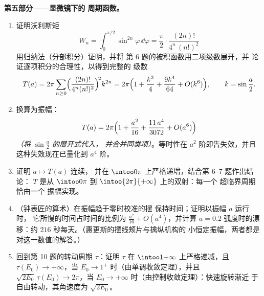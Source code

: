 \begin{problem}
\medskip
\noindent\textbf{第五部分——显微镜下的
周期函数。}
\begin{enumerate}[resume]
  \item 证明沃利斯矩
        \[
        W_n = \int_0^{\pi/2}\sin^{2n}\varphi\,\dd\varphi
        = \frac\pi2\cdot\frac{(2n)!}{4^n\,(n!)^2}
        \]
        用归纳法（分部积分）证明，并将
        第 6 题的被积函数用二项级数展开，并
        论证逐项积分的合理性，以得到完整的
        级数
        \[
        T(a) = 2\pi\sum_{n\geq0}
        \Bigl(\frac{(2n)!}{4^n(n!)^2}\Bigr)^{\!2}k^{2n}
        = 2\pi\Bigl(1 + \frac{k^2}4 + \frac{9k^4}{64}
        + O(k^6)\Bigr),
        \qquad k = \sin\frac a2 .
        \]
  \item 换算为振幅：
        \[
        T(a) = 2\pi\Bigl(1 + \frac{a^2}{16} +
        \frac{11\,a^4}{3072} + O(a^6)\Bigr)
        \]
        \emph{（将 $\sin\frac a2$ 的展开式代入，
        并合并同类项）}。等时性在 $a^2$ 阶即告失效，并且
        这种失效现在已量化到 $a^4$ 阶。
  \item 证明 $a \mapsto T(a)$ 连续，
        并在 $\intoo0\pi$ 上严格递增，结合第 6--7 题作出结论：
        $T$ 是从
        $\intoo0\pi$ 到 $\intoo{2\pi}{+\infty}$ 上的双射：每一个
        超临界周期恰由一个
        振幅实现。
  \item （钟表匠的算术）在振幅趋于零时校准的摆
        保持时间；证明以振幅 $a$ 运行时，
        它所慢的时间占时间的比例为
        $\frac{a^2}{16} + O(a^4)$，并计算
        $a = 0.2$ 弧度时的漂移：约
        $216$ 秒每天。（惠更斯的摆线颊片与擒纵机构的
        小恒定振幅，两者都是
        对这一数值的解答。）
  \item 回到第
        10 题的转动周期 $\tau$：证明 $\tau$ 在
        $\intoo1{+\infty}$ 上严格递减，且 $\tau(E_0) \to +\infty$，当
        $E_0 \to 1^+$ 时（由单调收敛定理），并且
        $\sqrt{2E_0}\,\tau(E_0) \to 2\pi$，当 $E_0 \to
        +\infty$ 时（由控制收敛定理）：快速旋转渐近
        于自由转动，其角速度为
        $\sqrt{2E_0}$。
\end{enumerate}


\end{problem}
